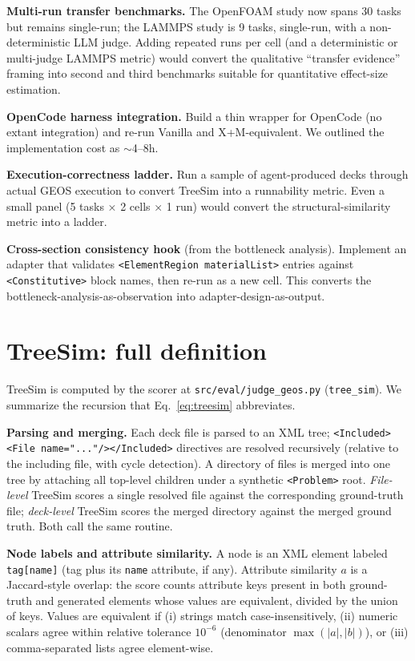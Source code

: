 \documentclass{article}
\begin{document}
\textbf{Multi-run transfer benchmarks.} The OpenFOAM study now spans 30 tasks but remains single-run; the LAMMPS study is 9 tasks, single-run, with a non-deterministic LLM judge. Adding repeated runs per cell (and a deterministic or multi-judge LAMMPS metric) would convert the qualitative ``transfer evidence'' framing into second and third benchmarks suitable for quantitative effect-size estimation.

\textbf{OpenCode harness integration.} Build a thin wrapper for OpenCode (no extant integration) and re-run Vanilla and X+M-equivalent. We outlined the implementation cost as $\sim$4--8h.

\textbf{Execution-correctness ladder.} Run a sample of agent-produced decks through actual GEOS execution to convert TreeSim into a runnability metric. Even a small panel (5 tasks × 2 cells × 1 run) would convert the structural-similarity metric into a ladder.

\textbf{Cross-section consistency hook} (from the bottleneck analysis). Implement an adapter that validates \texttt{<ElementRegion materialList>} entries against \texttt{<Constitutive>} block names, then re-run as a new cell. This converts the bottleneck-analysis-as-observation into adapter-design-as-output.
\fi %

\section{TreeSim: full definition}
\label{app:treesim}

TreeSim is computed by the scorer at \texttt{src/eval/judge\_geos.py} (\texttt{tree\_sim}). We summarize the recursion that Eq.~\ref{eq:treesim} abbreviates.

\textbf{Parsing and merging.} Each deck file is parsed to an XML tree; \texttt{<Included><File name="..."/></Included>} directives are resolved recursively (relative to the including file, with cycle detection). A directory of files is merged into one tree by attaching all top-level children under a synthetic \texttt{<Problem>} root. \emph{File-level} TreeSim scores a single resolved file against the corresponding ground-truth file; \emph{deck-level} TreeSim scores the merged directory against the merged ground truth. Both call the same routine.

\textbf{Node labels and attribute similarity.} A node is an XML element labeled \texttt{tag[name]} (tag plus its \texttt{name} attribute, if any). Attribute similarity $a$ is a Jaccard-style overlap: the score counts attribute keys present in both ground-truth and generated elements whose values are equivalent, divided by the union of keys. Values are equivalent if (i) strings match case-insensitively, (ii) numeric scalars agree within relative tolerance $10^{-6}$ (denominator $\max(|a|,|b|)$), or (iii) comma-separated lists agree element-wise.
\end{document}
